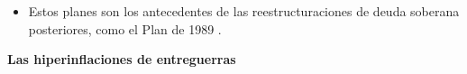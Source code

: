 \documentclass[11pt]{article}
\begin{document}
\begin{itemize}
\begin{itemize}
  \item los pagos se suspendieron con la moratoria  (1931) y se cancelaron en la práctica en la Conferencia de Lausana (1932).\footnote{El gobierno nazi, en el poder desde 1933, repudió la deuda. El Acuerdo de Londres de 1953 aplazó una parte hasta la reunificación, y Alemania pagó el último plazo de los bonos de entreguerras el 3~de octubre de 2010.}
  \end{itemize}
\item Estos planes son los antecedentes de las reestructuraciones de deuda soberana posteriores, como el Plan  de 1989 .
\end{itemize}

\begin{anotaciones}
\textbf{Las hiperinflaciones de entreguerras}


\end{anotaciones}
\end{document}
